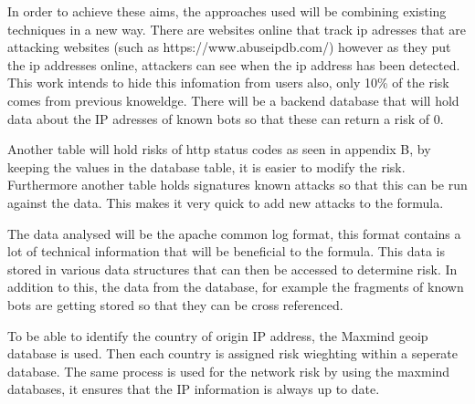In order to achieve these aims, the approaches used will be combining existing techniques in a new way. There are websites online that track ip adresses that are attacking websites (such as https://www.abuseipdb.com/) however as they put the ip addresses online, attackers can see when the ip address has been detected. This work intends to hide this infomation from users also, only 10\% of the risk comes from previous knoweldge. There will be a backend database that will hold data about the IP adresses of known bots so that these can return a risk of 0. 

Another table will hold risks of http status codes as  seen in appendix B, by keeping the values in the database table, it is easier to modify the risk. Furthermore another table holds signatures known attacks so that this can be run against the data. This makes it very quick to add new attacks to the formula.

The data analysed will be the apache common log format, this format contains a lot of technical information that will be beneficial to the formula. This data is stored in various data structures that can then be accessed to determine risk. In addition to this, the data from the database, for example the fragments of known bots are getting stored so that they can be cross referenced.  

To be able to identify the country of origin IP address, the Maxmind geoip database is used. Then each country is assigned risk wieghting within a seperate database. The same process is used for the network risk by using the maxmind databases, it ensures that the IP information is always up to date.